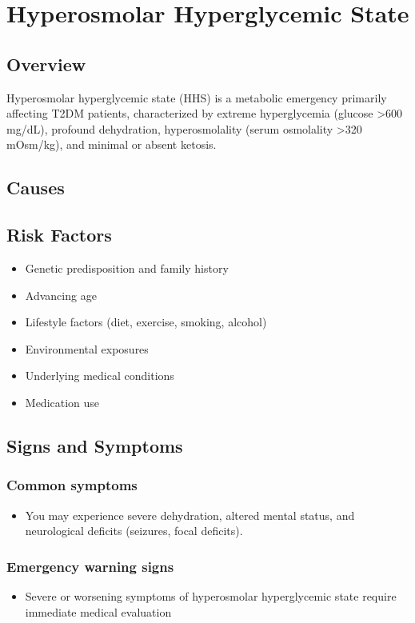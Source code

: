 \chapter{Hyperosmolar Hyperglycemic State}
\label{sec:Hyperosmolar Hyperglycemic State}

\section{Overview}
Hyperosmolar hyperglycemic state (HHS) is a metabolic emergency primarily affecting T2DM patients, characterized by extreme hyperglycemia (glucose >600 mg/dL), profound dehydration, hyperosmolality (serum osmolality >320 mOsm/kg), and minimal or absent ketosis.
\section{Causes}
\section{Risk Factors}

\begin{itemize}[noitemsep]
  \item Genetic predisposition and family history
  \item Advancing age
  \item Lifestyle factors (diet, exercise, smoking, alcohol)
  \item Environmental exposures
  \item Underlying medical conditions
  \item Medication use
\end{itemize}
\section{Signs and Symptoms}

\subsection{Common symptoms}
\begin{itemize}[noitemsep]
  \item You may experience severe dehydration, altered mental status, and neurological deficits (seizures, focal deficits). 
  \end{itemize}

\subsection{Emergency warning signs}
\begin{itemize}[noitemsep]
  \item Severe or worsening symptoms of hyperosmolar hyperglycemic state require immediate medical evaluation
\end{itemize}
